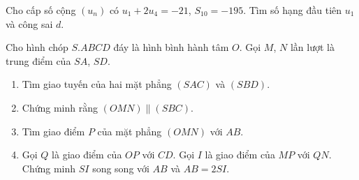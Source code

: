 \begin{bt}%
Cho cấp số cộng $(u_n)$ có $u_1+2u_4=-21$, $S_{10}=-195.$ Tìm số hạng đầu tiên $u_1$ và công sai $d.$
\end{bt}

\begin{bt}%
Cho hình chóp $S.ABCD$ đáy là hình bình hành tâm $O.$ Gọi $M$, $N$ lần lượt là trung điểm của $SA$,
$SD.$
\begin{enumerate}
\item Tìm giao tuyến của hai mặt phẳng $(SAC)$ và $(SBD).$
\item Chứng minh rằng $(OMN)\parallel (SBC).$
\item Tìm giao điểm $P$ của mặt phẳng $(OMN)$ với $AB.$
\item Gọi $Q$ là giao điểm của $OP$ với $CD.$ Gọi $I$ là giao điểm của $MP$ với $QN.$ Chứng minh $SI$
song song với $AB$ và $AB=2SI.$
\end{enumerate}
\end{bt}
